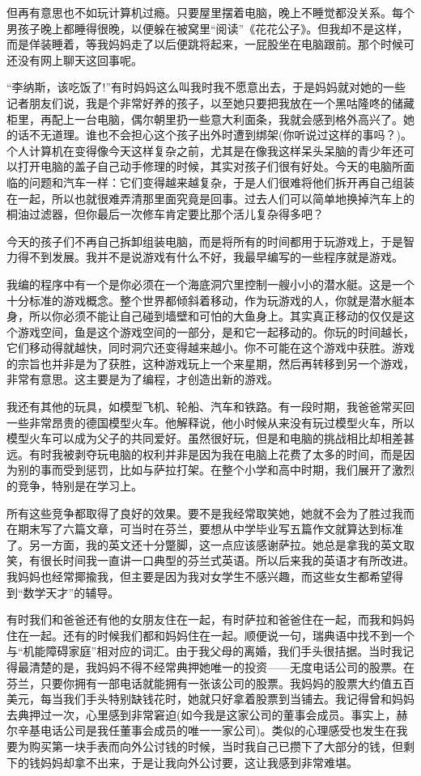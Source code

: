 但再有意思也不如玩计算机过瘾。只要屋里摆着电脑，晚上不睡觉都没关系。每个男孩子晚上都睡得很晚，以便躲在被窝里“阅读”《花花公子》。但我却不是这样，而是佯装睡着，等我妈妈走了以后便跳将起来，一屁股坐在电脑跟前。那个时候可还没有网上聊天这回事呢。

“李纳斯，该吃饭了!”有时妈妈这么叫我时我不愿意出去，于是妈妈就对她的一些记者朋友们说，我是个非常好养的孩子，以至她只要把我放在一个黑咕隆咚的储藏柜里，再配上一台电脑，偶尔朝里扔一些意大利面条，我就会感到格外高兴了。她的话不无道理。谁也不会担心这个孩子出外时遭到绑架(你听说过这样的事吗？)。个人计算机在变得像今天这样复杂之前，尤其是在像我这样呆头呆脑的青少年还可以打开电脑的盖子自己动手修理的时候，其实对孩子们很有好处。今天的电脑所面临的问题和汽车一样：它们变得越来越复杂，于是人们很难将他们拆开再自己组装在一起，所以也就很难弄清那里面究竟是回事。过去人们可以简单地换掉汽车上的桐油过滤器，但你最后一次修车肯定要比那个活儿复杂得多吧？

今天的孩子们不再自己拆卸组装电脑，而是将所有的时间都用于玩游戏上，于是智力得不到发展。我并不是说游戏有什么不好，我最早编写的一些程序就是游戏。

我编的程序中有一个是你必须在一个海底洞穴里控制一艘小小的潜水艇。这是一个十分标准的游戏概念。整个世界都倾斜着移动，作为玩游戏的人，你就是潜水艇本身，所以你必须不能让自己碰到墙壁和可怕的大鱼身上。其实真正移动的仅仅是这个游戏空间，鱼是这个游戏空间的一部分，是和它一起移动的。你玩的时间越长，它们移动得就越快，同时洞穴还变得越来越小。你不可能在这个游戏中获胜。游戏的宗旨也并非是为了获胜，这种游戏玩上一个来星期，然后再转移到另一个游戏，非常有意思。这主要是为了编程，才创造出新的游戏。

我还有其他的玩具，如模型飞机、轮船、汽车和铁路。有一段时期，我爸爸常买回一些非常昂贵的德国模型火车。他解释说，他小时候从来没有玩过模型火车，所以模型火车可以成为父子的共同爱好。虽然很好玩，但是和电脑的挑战相比却相差甚远。有时我被剥夺玩电脑的权利并非是因为我在电脑上花费了太多的时间，而是因为别的事而受到惩罚，比如与萨拉打架。在整个小学和高中时期，我们展开了激烈的竞争，特别是在学习上。

所有这些竞争都取得了良好的效果。要不是我经常取笑她，她就不会为了胜过我而在期末写了六篇文章，可当时在芬兰，要想从中学毕业写五篇作文就算达到标准了。另一方面，我的英文还十分蹩脚，这一点应该感谢萨拉。她总是拿我的英文取笑，有很长时间我一直讲一口典型的芬兰式英语。所以后来我的英语才有所改进。我妈妈也经常揶揄我，但主要是因为我对女学生不感兴趣，而这些女生都希望得到“数学天才”的辅导。

有时我们和爸爸还有他的女朋友住在一起，有时萨拉和爸爸住在一起，而我和妈妈住在一起。还有的时候我们都和妈妈住在一起。顺便说一句，瑞典语中找不到一个与“机能障碍家庭”相对应的词汇。由于我父母的离婚，我们手头很拮据。当时我记得最清楚的是，我妈妈不得不经常典押她唯一的投资——无度电话公司的股票。在芬兰，只要你拥有一部电话就能拥有一张该公司的股票。我妈妈的股票大约值五百美元，每当我们手头特别缺钱花时，她就只好拿着股票到当铺去。我记得曾和妈妈去典押过一次，心里感到非常窘迫(如今我是这家公司的董事会成员。事实上，赫尔辛基电话公司是我任董事会成员的唯一一家公司)。类似的心理感受也发生在我要为购买第一块手表而向外公讨钱的时候，当时我自己已攒下了大部分的钱，但剩下的钱妈妈却拿不出来，于是让我向外公讨要，这让我感到非常难堪。


